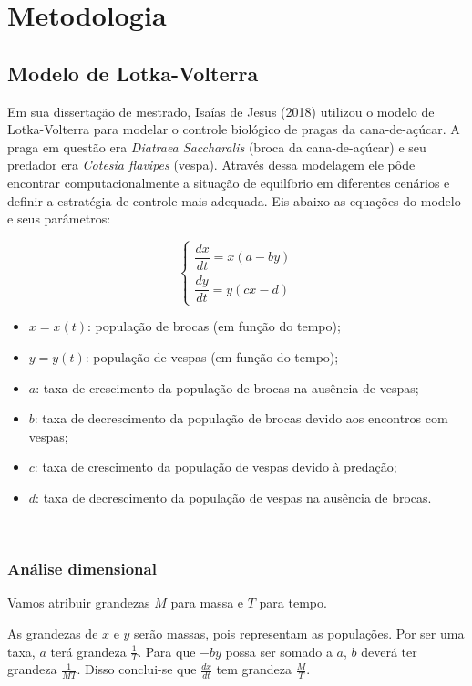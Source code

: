 \section{Metodologia}

\subsection{Modelo de Lotka-Volterra}

Em sua dissertação de mestrado, Isaías de Jesus (2018) \cite{ij_2018} utilizou o modelo de Lotka-Volterra para modelar o controle biológico de pragas da cana-de-açúcar. A praga em questão era \textit{Diatraea Saccharalis} (broca da cana-de-açúcar) e seu predador era \textit{Cotesia flavipes} (vespa). Através dessa modelagem ele pôde encontrar computacionalmente a situação de equilíbrio em diferentes cenários e definir a estratégia de controle mais adequada. Eis abaixo as equações do modelo e seus parâmetros:

$$\left\{
\begin{array}{l}
\dfrac{dx}{dt}=x(a-by)\\
\dfrac{dy}{dt}=y(cx-d)
\end{array}
\right.$$

\begin{itemize}
    \item $x=x(t)$: população de brocas (em função do tempo); 
    \item $y=y(t)$: população de vespas (em função do tempo);
    \item $a$: taxa de crescimento da população de brocas na ausência de vespas;
    \item $b$: taxa de decrescimento da população de brocas devido aos encontros com vespas;
    \item $c$: taxa de crescimento da população de vespas devido à predação;
    \item $d$: taxa de decrescimento da população de vespas na ausência de brocas.
\end{itemize}

\

\subsubsection{Análise dimensional}

Vamos atribuir grandezas $M$ para massa e $T$ para tempo.

As grandezas de $x$ e $y$ serão massas, pois representam as populações. Por ser uma taxa, $a$ terá grandeza $\frac{1}{T}$. Para que $-by$ possa ser somado a $a$, $b$ deverá ter grandeza $\frac{1}{MT}$. Disso conclui-se que $\frac{dx}{dt}$ tem grandeza $\frac{M}{T}$.

